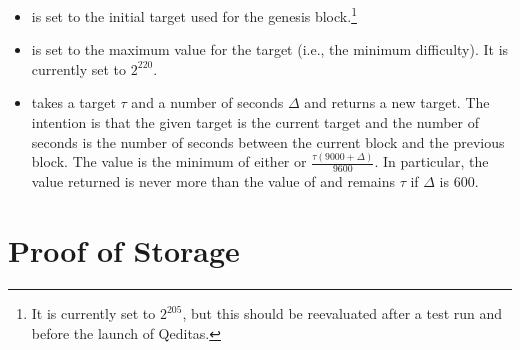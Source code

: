 \begin{itemize}
\item {} is set to the initial target used for the genesis block.\footnote{It is currently set to $2^{205}$, but this should be reevaluated after a test run and before the launch of Qeditas.}
\item {} is set to the maximum value for the target (i.e., the minimum difficulty). It
is currently set to $2^{220}$.
\item {} takes a target $\tau$ and a number of seconds $\Delta$ and returns a new target.
The intention is that the given target is the current target and the number of seconds
is the number of seconds between the current block and the previous block.
The value is the minimum of either {} or
$\frac{\tau (9000 + \Delta)}{9600}$.
In particular, the value returned is never more than the value of {}
and remains $\tau$ if $\Delta$ is 600.
\end{itemize}

\section{Proof of Storage}

